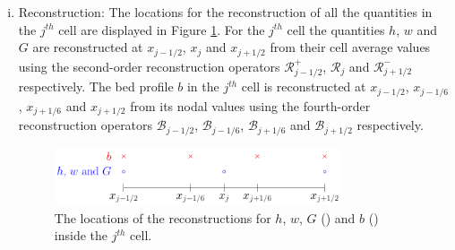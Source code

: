 \begin{enumerate}[(i)]
	\item Reconstruction: The locations for the reconstruction of all the quantities in the $j^{th}$ cell are displayed in Figure \ref{fig:ReconLocs}. For the $j^{th}$ cell the quantities $h$, $w$ and $G$ are reconstructed at $x_{j-1/2}$, $x_{j}$ and $x_{j+1/2}$ from their cell average values using the second-order reconstruction operators $\mathcal{R}^+_{j-1/2}$, $\mathcal{R}_{j}$ and $\mathcal{R}^-_{j+1/2}$ respectively. The bed profile $b$ in the $j^{th}$ cell is reconstructed at $x_{j-1/2}$, $x_{j-1/6}$, $x_{j+1/6}$ and $x_{j+1/2}$ from its nodal values using the fourth-order reconstruction operators $\mathcal{B}_{j-1/2}$, $\mathcal{B}_{j-1/6}$, $\mathcal{B}_{j+1/6}$ and $\mathcal{B}_{j+1/2}$ respectively. 
	\begin{figure}
		\centering
		\includegraphics[width=0.8\textwidth]{./chp3/figures/FEVMRecon.pdf}
		\caption{The locations of the reconstructions for $h$, $w$, $G$ () and $b$ () inside the $j^{th}$ cell.}
		\label{fig:ReconLocs}
	\end{figure}
	

\end{enumerate}
